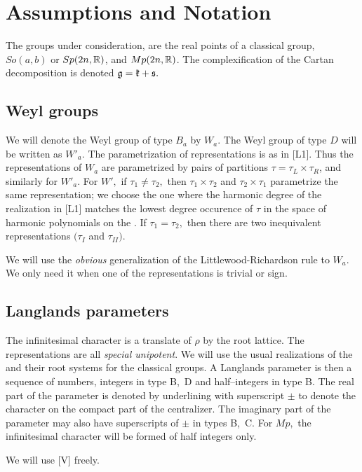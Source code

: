 \documentclass[11pt ,reqno]{amsart}
\begin{document}


\section{Assumptions and Notation}\label{1}

\bigskip
The groups under consideration, are the real points of a classical
group, $So(a,b)$ or $Sp(2n,{\mathbb R})$, and $Mp(2n,{\mathbb R})$. The
complexification of the Cartan
decomposition is denoted ${\mathfrak g}={\mathfrak k} + {\mathfrak s}.$

\medskip 
\subsection{Weyl groups}\label{1.1} We will denote the Weyl group of type $B_a$
by $W_a.$  The Weyl 
group of type $D$ will be written as $W'_{a}.$ The parametrization of
representations is as in [L1]. Thus the representations of $W_a$ are
parametrized by pairs of partitions $\tau=\tau_L\times\tau_R$, and
similarly for $W'_a.$ For $W',$ if $\tau_1\ne \tau_2,$ then
$\tau_1\times\tau_2$ and $\tau_2\times\tau_1$ parametrize the same
representation; we choose the one where the harmonic degree of the
realization in [L1] matches the lowest degree occurence of $\tau$ in
the space of harmonic polynomials on the \CSG. If $\tau_1=\tau_2,$
then there are two inequivalent representations $(\tau_I$ and
$\tau_{II}).$

We will use the {\it obvious} generalization of the Littlewood-Richardson
rule to $W_a.$ We only need it when one of the representations is trivial or sign.

\medskip
\subsection{Langlands parameters}\label{1.2} The infinitesimal character is a
translate of $\rho$ by the root lattice.  The representations are all {\it special
unipotent}. We will use the usual realizations of the \CSGs and their root systems
for the classical groups. A Langlands parameter is then a sequence of
numbers, integers in type B,\ D and half--integers in type B. The real
part of the parameter is denoted by underlining with superscript $\pm$
to denote the character on the compact part of the centralizer. The
imaginary part of the parameter may also have superscripts of $\pm$ in
types B,\ C. For  $Mp,$ the infinitesimal character will be formed
of half integers only.

\medskip
We will use [V] freely.
\end{document}

